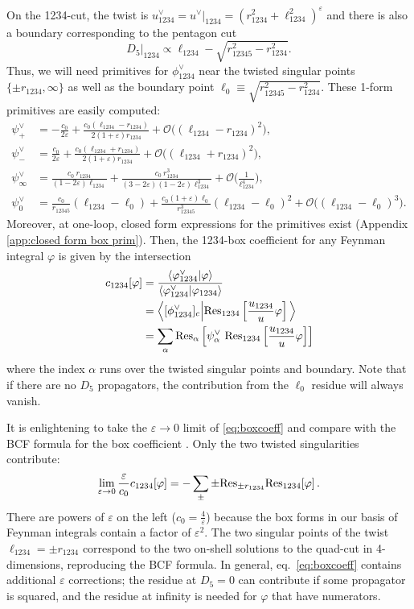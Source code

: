 \documentclass[11pt]{article}
\newcommand{\nn}{\nonumber}
\newcommand{\be}{\begin{equation}}
\newcommand{\ee}{\end{equation}}
\newcommand{\la}{\langle}
\newcommand{\ra}{\rangle}
\renewcommand{\O}{\mathcal{O}}
\newcommand{\res}{{\rm Res}}
\newcommand{\vphi}{\varphi}
\newcommand{\vep}{\varepsilon}
\begin{document}
On the 1234-cut, the twist is $u_{1234}^\vee = u^\vee\vert_{1234} = \left( r_{1234}^2 + \ell_{1234}^2 \right)^{\vep}$ and there is also a boundary corresponding to the pentagon cut \be
	D_5\vert_{1234} 
	\propto \ell_{1234} - \sqrt{r_{12345}^2-r_{1234}^2}.
\ee
Thus, we will need primitives for $\phi^\vee_{1234}$ near the twisted singular points $\{ \pm r_{1234}, \infty \}$ as well as the boundary point $\ell_{0} \equiv \sqrt{r_{12345}^2-r_{1234}^2}$. These 1-form primitives are easily computed:
\begin{align}
	\psi^\vee_+ &= -\frac{c_0}{2 \vep} 
		+ \frac{c_0 (\ell_{1234} - r_{1234})}{2(1+\vep) r_{1234}} 
		+ \O\Big((\ell_{1234}-r_{1234})^2\Big),
\\
	\psi^\vee_- &= \frac{c_0}{2 \vep } 
		+ \frac{c_0 (\ell_{1234} + r_{1234})}{2(1+\vep) r_{1234}} 
		+ \O\Big((\ell_{1234}+r_{1234})^2\Big),
\\
	\psi^\vee_\infty &= \frac{c_0\ r_{1234}}{(1-2\vep)\ell_{1234}} 
		+ \frac{c_0\ r_{1234}^3}{(3-2\vep)(1-2\vep)\ell_{1234}^3}
		+ \O\Big(\frac{1}{\ell_{1234}^4}\Big),
\\
	\psi^\vee_0 &= \frac{c_0}{r_{12345}} (\ell_{1234}-\ell_0) 
		+ \frac{c_0 (1+\vep)\ell_0}{r_{12345}^3} (\ell_{1234}-\ell_0)^2 
		+ \O\Big( (\ell_{1234}-\ell_0)^3 \Big).
\end{align}
Moreover, at one-loop, closed form expressions for the primitives exist (Appendix \ref{app:closed form box prim}). Then, the 1234-box coefficient for any Feynman integral $\vphi$ is given by the intersection
\begin{align} \label{eq:boxcoeff}
	c_{1234}[\vphi] 
	&=\frac{\la \vphi^\vee_{1234} \vert \vphi \ra}{\la \vphi^\vee_{1234} \vert \vphi_{1234} \ra}
	\nn \\
	&= 
		\Big\la [\phi^\vee_{1234}]_c \Big\vert \res_{1234} \left[ \frac{u_{1234}}{u}\vphi \right] \Big\ra
	\nn \\
	&=
	\sum_\alpha \res_\alpha  \left[ \psi^\vee_\alpha\ \res_{1234} \left[ \frac{u_{1234}}{u}\vphi \right] \right]
\end{align}
where the index $\alpha$ runs over the twisted singular points and boundary. Note that if there are no $D_5$ propagators, the contribution from the $\ell_0$ residue will always vanish.

It is enlightening to take the $\vep\to 0$ limit of \eqref{eq:boxcoeff} and compare with the BCF formula for the box coefficient \cite{Britto:2004nc}. Only the two twisted singularities contribute: 
\be \lim_{\vep\to 0} \frac{\vep}{c_0}c_{1234}[\vphi]  = -\sum_\pm \pm\res_{\pm r_{1234}} \res_{1234} [\vphi]\,.
\ee
There are powers of $\vep$ on the left ($c_0=\frac{4}{\vep}$) because the box forms in our basis of Feynman integrals contain a factor of $\vep^2$.
The two singular points of the twist $\ell_{1234}=\pm r_{1234}$ correspond to the two on-shell solutions to the quad-cut in 4-dimensions,
reproducing the BCF formula.  In general, eq.~\eqref{eq:boxcoeff} contains additional $\vep$ corrections;
the residue at $D_5=0$ can contribute if some propagator is squared, and the residue at infinity is needed for $\vphi$ that have numerators.
\end{document}
